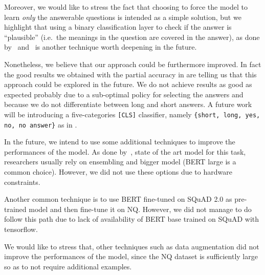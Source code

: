 \documentclass[10pt,hidelinks]{article}
\begin{document}
Moreover, we would like to stress the fact that choosing to force the model to learn \emph{only} the answerable questions is intended as a simple solution, but we highlight that using a binary classification layer to check if the answer is ``plausible'' (i.e.~the meanings in the question are covered in the answer), as done by~\cite{Hu2019ReadV} and~\cite{Back2020NeurQuRI} is another technique worth deepening in the future.

Nonetheless, we believe that our approach could be furthermore improved.
In fact the good results we obtained with the partial accuracy in  are telling us that this approach could be explored in the future.
We do not achieve results as good as expected probably due to a sub-optimal policy for selecting the answers and because we do not differentiate between long and short answers.
A future work will be introducing a five-categories \texttt{[CLS]} classifier, namely \texttt{\{short, long, yes, no, no answer\}} as in \cite{alberti}.

In the future, we intend to use some additional techniques to improve the performances of the model. 
As done by~\cite{IBM}, state of the art model for this task, researchers usually rely on ensembling and bigger model (BERT large is a common choice).
However, we did not use these options due to hardware constraints.

Another common technique is to use BERT fine-tuned on SQuAD 2.0 as pre-trained model and then fine-tune it on NQ.
However, we did not manage to do follow this path due to lack of availability of BERT base trained on SQuAD with tensorflow.

We would like to stress that, other techniques such as data augmentation did not improve the performances of the model, since the NQ dataset is sufficiently large so as to not require additional examples. 
\end{document}
